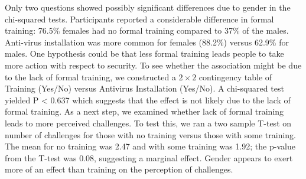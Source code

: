 \begin{table}[ht]
\caption{Results from Pearson's Chi-Squared test on gender for questions 6 - 13. Columns show $\chi$-squared value, degrees of freedom (df), p value and the category with the largest \% difference between females and males (negative indicates lower value for females. $\alpha<0.05$}
\label{tab:cypreusage}
\end{table}

Only two questions showed possibly significant differences due to gender in the chi-squared tests. Participants reported a considerable difference in formal training: 76.5\% females had no formal training compared to 37\% of the males. Anti-virus installation was more common for females (88.2\%) versus 62.9\% for males. One hypothesis could be that less formal training leads people to take more action with respect to security. To see whether the association might be due to the lack of formal training, we constructed a $2\times 2$ contingency table of Training (Yes/No) versus Antivirus Installation (Yes/No). A chi-squared test yielded P < 0.637 which suggests that the effect is not likely due to the lack of formal training. As a next step, we examined whether lack of formal training leads to more perceived challenges. To test this, we ran a two sample T-test on number of challenges for those with no training versus those with some training. The mean for no training was 2.47 and with some training was 1.92; the p-value from the T-test was 0.08, suggesting a marginal effect. Gender appears to exert more of an effect than training on the perception of challenges.

